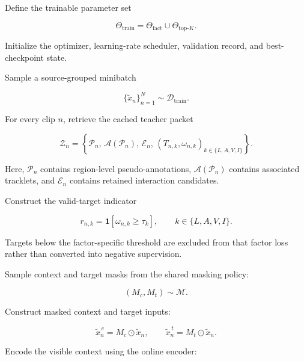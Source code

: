 \begin{tcolorbox}
\begin{algsteps}
\item
Define the trainable parameter set

\[
\Theta_{\mathrm{train}}
=
\Theta_{\mathrm{fact}}
\cup
\Theta_{\mathrm{top}\text{-}K}.
\]

\item
Initialize the optimizer, learning-rate scheduler, validation record,
and best-checkpoint state.


\item
Sample a source-grouped minibatch

\[
\{\widetilde x_n\}_{n=1}^{N}
\sim
\mathcal D_{\mathrm{train}}.
\]

\item
For every clip \(n\), retrieve the cached teacher packet

\[
\mathcal Z_n
=
\left\{
\mathcal P_n,\,
\mathcal A(\mathcal P_n),\,
\mathcal E_n,\,
(T_{n,k},\omega_{n,k})_{k\in\{L,A,V,I\}}
\right\}.
\]

Here, \(\mathcal P_n\) contains region-level pseudo-annotations,
\(\mathcal A(\mathcal P_n)\) contains associated tracklets, and
\(\mathcal E_n\) contains retained interaction candidates.

\item
Construct the valid-target indicator

\[
r_{n,k}
=
\mathbf 1
\left[
\omega_{n,k}\ge\tau_k
\right],
\qquad
k\in\{L,A,V,I\}.
\]

Targets below the factor-specific threshold are excluded from that
factor loss rather than converted into negative supervision.

\item
Sample context and target masks from the shared masking policy:

\[
(M_c,M_t)\sim\mathcal M.
\]

\item
Construct masked context and target inputs:

\[
\widetilde x_n^{\,c}
=
M_c\odot\widetilde x_n,
\qquad
\widetilde x_n^{\,t}
=
M_t\odot\widetilde x_n.
\]


\item
Encode the visible context using the online encoder:


\end{algsteps}
\end{tcolorbox}
